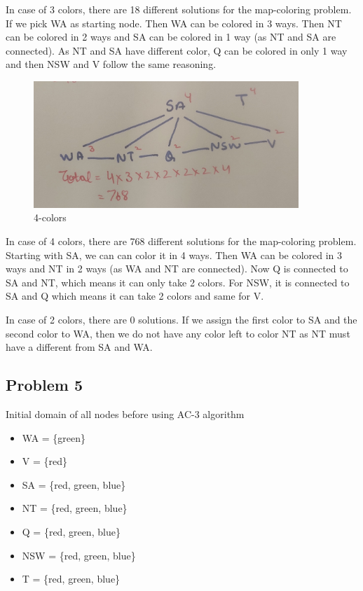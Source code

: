 \documentclass[12pt,a4paper]{article}
\begin{document}
In case of 3 colors, there are 18 different solutions for the map-coloring problem. If we pick WA as starting node. Then WA can be colored in 3 ways. Then NT can be colored in 2 ways and SA can be colored in 1 way (as NT and SA are connected). As NT and SA have different color, Q can be colored in only 1 way and then NSW and V follow the same reasoning.

\begin{figure}[H]
    \centering
    \includegraphics[width=10cm]{prob4_2.jpg}
    \caption{4-colors}
\end{figure}

In case of 4 colors, there are 768 different solutions for the map-coloring problem. Starting with SA, we can can color it in 4 ways. Then WA can be colored in 3 ways and NT in 2 ways (as WA and NT are connected). Now Q is connected to SA and NT, which means it can only take 2 colors. For NSW, it is connected to SA and Q which means it can take 2 colors and same for V.

In case of 2 colors, there are 0 solutions. If we assign the first color to SA and the second color to WA, then we do not have any color left to color NT as NT must have a different from SA and WA.

\subsection*{Problem 5}

Initial domain of all nodes before using AC-3 algorithm
\begin{itemize}
    \item WA = \{green\}
    \item V = \{red\}
    \item SA = \{red, green, blue\}
    \item NT = \{red, green, blue\}
    \item Q = \{red, green, blue\}
    \item NSW = \{red, green, blue\}
    \item T = \{red, green, blue\}
\end{itemize}
\end{document}
